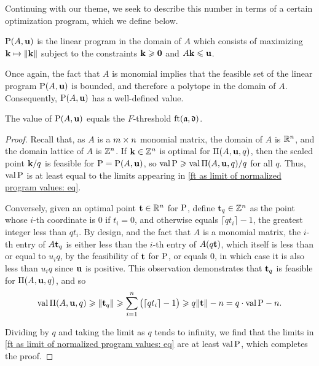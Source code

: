 \documentclass[11pt]{amsart}
\begin{document}
Continuing with our theme, we seek to describe this number in terms of a certain optimization program, which we define below.

\begin{definition}
\label{LP: D}
 $\mathrm{P}(A, \mathbf{u})$ is the linear program in the domain of $A$ which consists of maximizing $\mathbf{k} \mapsto \| \mathbf{k} \|$ subject to the constraints $\mathbf{k} \geqslant \mathbf{0}$ and $A \mathbf{k} \leqslant \mathbf{u}$.
\end{definition}

Once again, the fact that $A$ is monomial implies that the feasible set of the linear program $\mathrm{P}(A,\mathbf{u})$ is bounded, and therefore a polytope in the domain of $A$.  Consequently, $\mathrm{P}(A,\mathbf{u})$ has a well-defined value.


\begin{proposition}
\label{ft as val LP: P}
The value of $\mathrm{P}(A, \mathbf{u})$ equals the $F$-threshold $\operatorname{ft}(\mathfrak{a}, \mathfrak{d})$.
\end{proposition}

\begin{proof}
  Recall that, as $A$ is a $m \times n$ monomial matrix, the domain of $A$ is $\mathbb{R}^n$, and the domain lattice of $A$ is $\mathbb{Z}^n$.  If $\mathbf{k} \in \mathbb{Z}^n$ is optimal for $\Pi(A,\mathbf{u},q)$, then the scaled point $\mathbf{k}/q$ is feasible for $\mathrm{P} = \mathrm{P}(A, \mathbf{u})$, so $\operatorname{val} \mathrm{P} \geqslant \operatorname{val} \Pi(A, \mathbf{u}, q)/q$ for all $q$.
   Thus, $\operatorname{val} \mathrm{P}$ is at least equal to the limits appearing in \eqref{ft as limit of normalized program values: eq}.

   Conversely, given an optimal point $\mathbf{t} \in \mathbb{R}^n$ for $\mathrm{P}$,
   define $\mathbf{t}_q \in \mathbb{Z}^n$ as the point whose $i$-th coordinate is $0$ if $t_i=0$, and otherwise equals $\lceil q t_i \rceil - 1$, the greatest integer less than $q t_i$.
   By design, and the fact that $A$ is a monomial matrix, the $i$-th entry of $A \mathbf{t}_q$ is either less than the $i$-th entry of $A (q \mathbf{t})$, which itself is less than or equal to $u_iq$, by the feasibility of $\mathbf{t}$ for $\mathrm{P}$, or equals $0$,  in which case it is also less than $u_i q$ since $\mathbf{u}$ is positive. This observation demonstrates that $\mathbf{t}_q$ is feasible for $\Pi(A, \mathbf{u}, q)$, and so
   \[\operatorname{val} \Pi(A, \mathbf{u}, q) \geqslant \| \mathbf{t}_q \| \geqslant \sum_{i=1}^n \big(\lceil q t_i \rceil - 1\big) \geqslant q \| \mathbf{t} \| -n = q \cdot \operatorname{val} \mathrm{P} - n.\]
   
   Dividing by $q$ and taking the limit as $q$ tends to infinity, we find that the limits in \eqref{ft as limit of normalized program values: eq} are at least $\operatorname{val} \mathrm{P}$, which completes the proof.
\end{proof}
\end{document}
